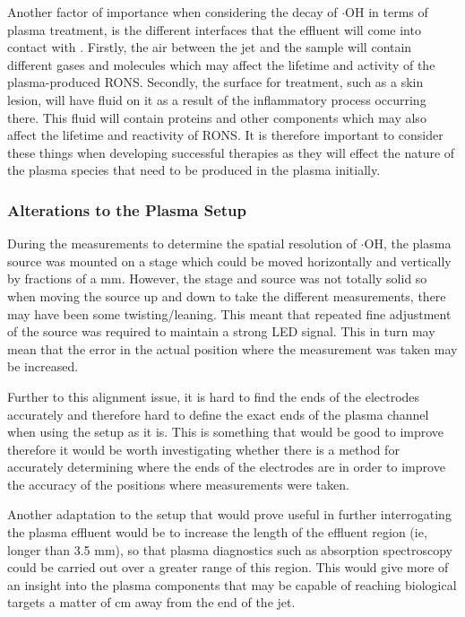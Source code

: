 \documentclass[11pt, oneside]{article}   	%
\begin{document}
Another factor of importance when considering the decay of $\cdot$OH in terms of plasma treatment, is the different interfaces that the effluent will come into contact with \cite{Hirst2016}.
Firstly, the air between the jet and the sample will contain different gases and molecules which may affect the lifetime and activity of the plasma-produced RONS.
Secondly, the surface for treatment, such as a skin lesion, will have fluid on it as a result of the inflammatory process occurring there.
This fluid will contain proteins and other components which may also affect the lifetime and reactivity of RONS.
It is therefore important to consider these things when developing successful therapies as they will effect the nature of the plasma species that need to be produced in the plasma initially.

\subsubsection{Alterations to the Plasma Setup}

During the measurements to determine the spatial resolution of $\cdot$OH, the plasma source was mounted on a stage which could be moved horizontally and vertically by fractions of a mm.
However, the stage and source was not totally solid so when moving the source up and down to take the different measurements, there may have been some twisting/leaning. This meant that repeated fine adjustment of the source was required to maintain a strong LED signal. 
This in turn may mean that the error in the actual position where the measurement was taken may be increased. 

Further to this alignment issue, it is hard to find the ends of the electrodes accurately and therefore hard to define the exact ends of the plasma channel when using the setup as it is.
This is something that would be good to improve therefore it would be worth investigating whether there is a method for accurately determining where the ends of the electrodes are in order to improve the accuracy of the positions where measurements were taken.

Another adaptation to the setup that would prove useful in further interrogating the plasma effluent would be to increase the length of the effluent region (ie, longer than 3.5 mm), so that plasma diagnostics such as absorption spectroscopy could be carried out over a greater range of this region.
This would give more of an insight into the plasma components that may be capable of reaching biological targets a matter of cm away from the end of the jet.
\end{document}
